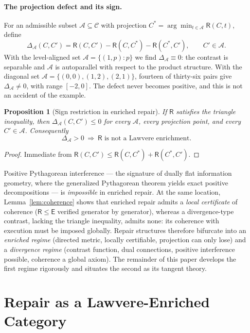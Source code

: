 \documentclass[11pt]{article}
\newtheorem{proposition}[theorem]{Proposition}
\theoremstyle{remark}
\newcommand{\C}{\mathcal{C}}
\newcommand{\A}{\mathcal{A}}
\newcommand{\R}{\mathsf{R}}
\newcommand{\E}{\mathsf{E}}
\begin{document}
\paragraph{The projection defect and its sign.}
For an admissible subset $\A\subseteq\C$ with projection
$C^{*} = \arg\min_{t\in\A}\R(C,t)$, define
\[
\Delta_{\A}(C,C') = \R(C,C') - \R(C,C^{*}) - \R(C^{*},C'),
\qquad C'\in\A .
\]
With the level-aligned set $\A=\{(1,p): p\}$ we find
$\Delta_{\A}\equiv 0$: the contrast is separable and $\A$ is
autoparallel with respect to the product structure. With the diagonal
set $\A=\{(0,0),(1,2),(2,1)\}$, fourteen of thirty-six pairs give
$\Delta_{\A}\neq 0$, with range $[-2,0]$. The defect never becomes
positive, and this is not an accident of the example.

\begin{proposition}[Sign restriction in enriched repair]
\label{prop:sign}
If $\R$ satisfies the triangle inequality, then
$\Delta_{\A}(C,C')\le 0$ for every $\A$, every projection point, and
every $C'\in\A$. Consequently
\[
\Delta_{\A} > 0 \ \Longrightarrow\ \R \text{ is not a Lawvere
enrichment.}
\]
\end{proposition}

\begin{proof}
Immediate from $\R(C,C')\le \R(C,C^{*})+\R(C^{*},C')$.
\end{proof}

\begin{tcolorbox}[title={The fork}]
Positive Pythagorean interference --- the signature of dually flat
information geometry, where the generalized Pythagorean theorem yields
exact positive decompositions --- is \emph{impossible} in enriched
repair. At the same location, Lemma~\ref{lem:coherence} shows that
enriched repair admits a \emph{local certificate} of coherence
($\R\le\E$ verified generator by generator), whereas a divergence-type
contrast, lacking the triangle inequality, admits none: its coherence
with execution must be imposed globally. Repair structures therefore
bifurcate into an \emph{enriched regime} (directed metric, locally
certifiable, projection can only lose) and a \emph{divergence regime}
(contrast function, dual connections, positive interference possible,
coherence a global axiom). The remainder of this paper develops the
first regime rigorously and situates the second as its tangent theory.
\end{tcolorbox}

\section{Repair as a Lawvere-Enriched Category}
\end{document}
